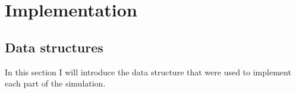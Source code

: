 \chapter{Implementation}

\section{Data structures}

In this section I will introduce the data structure that were used to implement each part of the simulation. 









                                    